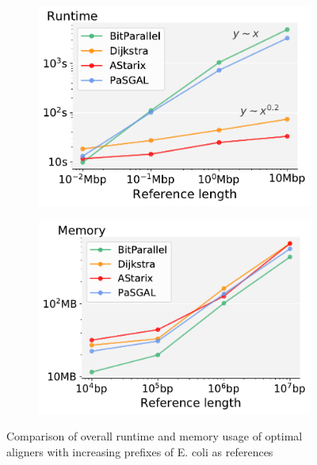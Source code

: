 \begin{figure}[t]
  \begin{subfigure}{.45\textwidth}
    \centering
    \includegraphics[width=\linewidth]{figs/cmp/performance_vs_genomesize-head_Mbpxs.pdf}
  \end{subfigure}
  \begin{subfigure}{.45\textwidth}
    \centering
    \includegraphics[width=\linewidth]{figs/cmp/memory_vs_genomesize-headxmax_rss.pdf}
  \end{subfigure}
  \caption[Performance scaling with reference size]{Comparison of overall
     runtime and memory usage of optimal aligners with increasing prefixes of E.
     coli as references}
  \label{TRIEfig:scaling_with_graphsize}
\end{figure}
